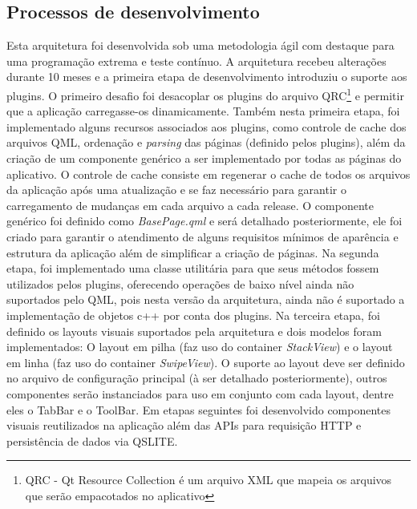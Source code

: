 \subsection{Processos de desenvolvimento}
Esta arquitetura foi desenvolvida sob uma metodologia ágil com destaque para uma programação extrema e teste contínuo. A arquitetura recebeu alterações durante 10 meses e a primeira etapa de desenvolvimento introduziu o suporte aos plugins. O primeiro desafio foi desacoplar os plugins do arquivo QRC\footnote{QRC - Qt Resource Collection é um arquivo XML que mapeia os arquivos que serão empacotados no aplicativo} e permitir que a aplicação carregasse-os dinamicamente. Também nesta primeira etapa, foi implementado alguns recursos associados aos plugins, como controle de cache dos arquivos QML, ordenação e \textit{parsing} das páginas (definido pelos plugins), além da criação de um componente genérico a ser implementado por todas as páginas do aplicativo. O controle de cache consiste em regenerar o cache de todos os arquivos da aplicação após uma atualização e se faz necessário para garantir o carregamento de mudanças em cada arquivo a cada release. O componente genérico foi definido como \textit{BasePage.qml} e será detalhado posteriormente, ele foi criado para garantir o atendimento de alguns requisitos mínimos de aparência e estrutura da aplicação além de simplificar a criação de páginas. Na segunda etapa, foi implementado uma classe utilitária para que seus métodos fossem utilizados pelos plugins, oferecendo operações de baixo nível ainda não suportados pelo QML, pois nesta versão da arquitetura, ainda não é suportado a implementação de objetos c++ por conta dos plugins. Na terceira etapa, foi definido os layouts visuais suportados pela arquitetura e dois modelos foram implementados: O layout em pilha (faz uso do container \textit{StackView}) e o layout em linha (faz uso do container \textit{SwipeView}). O suporte ao layout deve ser definido no arquivo de configuração principal (à ser detalhado posteriormente), outros componentes serão instanciados para uso em conjunto com cada layout, dentre eles o TabBar e o ToolBar. Em etapas seguintes foi desenvolvido componentes visuais reutilizados na aplicação além das APIs para requisição HTTP e persistência de dados via QSLITE.


